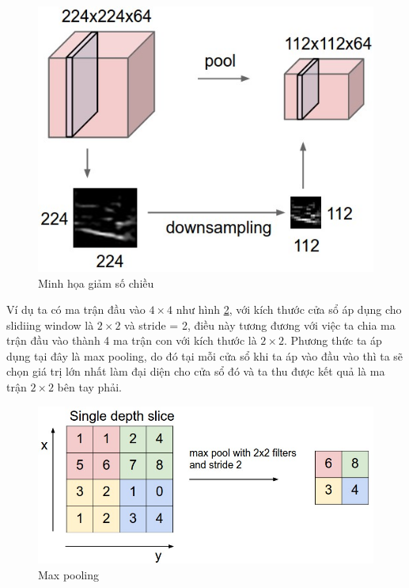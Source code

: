 \begin{center}
\begin{figure}[H]
	\begin{center}
		\includegraphics[scale=0.5]{chap4/image/poolEx.jpeg}
	\end{center}
	\caption{Minh họa giảm số chiều}
	\label{fig:pool}
\end{figure}
\end{center}
Ví dụ ta có ma trận đầu vào $4\times 4$  như hình \ref{fig:poolExample}, với kích thước cửa sổ áp dụng cho slidiing window là $2\times 2$ và stride = 2, điều này tương đương với việc ta chia ma trận đầu vào thành 4 ma trận con với kích thước là $2\times2$.  Phương thức ta áp dụng tại đây là max pooling, do đó tại mỗi cửa sổ khi ta áp vào đầu vào thì ta sẽ chọn giá trị lớn nhất làm đại diện cho cửa sổ đó và ta thu được kết quả là ma trận $2\times2$ bên tay phải.
\begin{center}
\begin{figure}[htp]
	\begin{center}
		\includegraphics[scale=0.5]{chap4/image/maxpoolEx.jpeg}
	\end{center}
	\caption{Max pooling}
	\label{fig:poolExample}
\end{figure}
\end{center}
